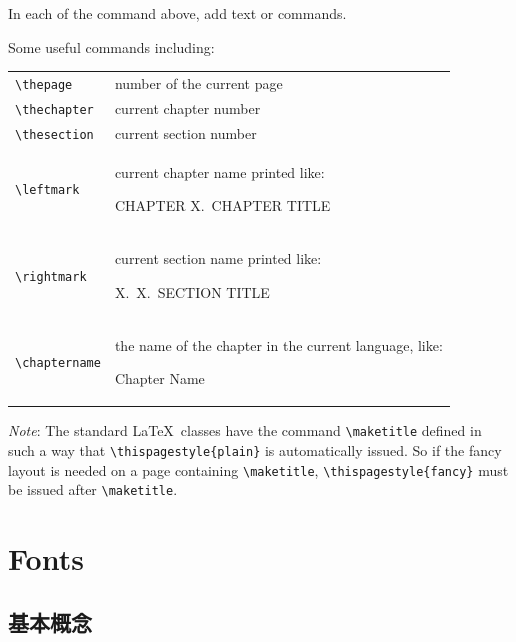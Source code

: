 \documentclass[a4paper,oneside]{book}
\begin{document}
In each of the command above, add text or commands.

Some useful commands including:

\begin{tabular}[h]{lp{8cm}}
  \verb|\thepage| & number of the current page\\
  \verb|\thechapter| & current chapter number\\
  \verb|\thesection| & current section number\\
  \verb|\leftmark| & current chapter name printed like:
  \begin{center}
    CHAPTER X.~CHAPTER TITLE 
  \end{center}\\
  \verb|\rightmark| & current section name printed like: 
  \begin{center}
  X.~X.~SECTION TITLE
\end{center}\\
  \verb|\chaptername| & the name of the chapter in the current language, like:
  \begin{center}
    Chapter Name
  \end{center}
\end{tabular}

\emph{Note}: The standard \LaTeX~classes have the command \verb|\maketitle| defined in such a way that \verb|\thispagestyle{plain}| is automatically issued. So if the fancy layout is needed on a page containing \verb|\maketitle|, \verb|\thispagestyle{fancy}| must be issued after \verb|\maketitle|.


\part{Fonts}
\chapter{基本概念}
\end{document}
